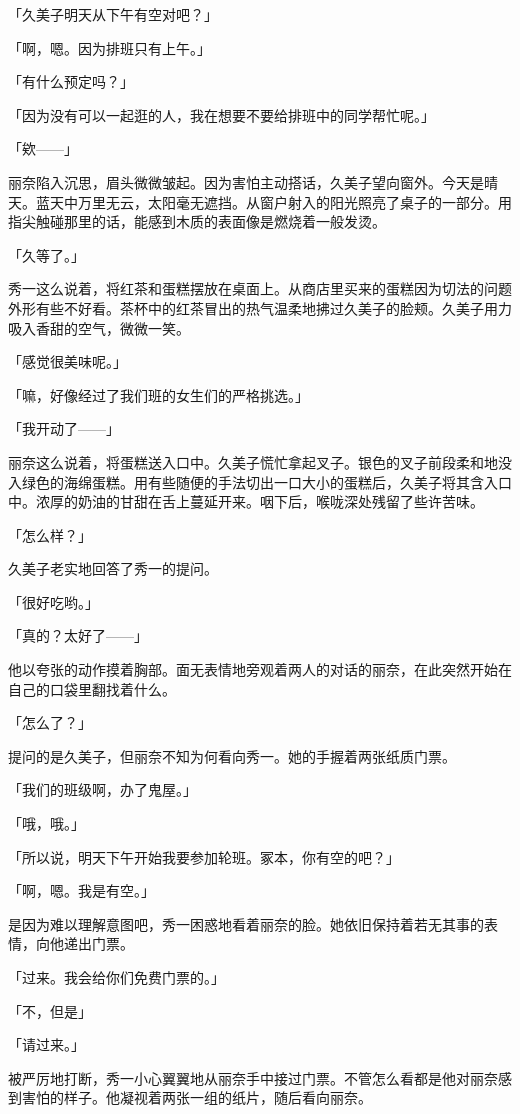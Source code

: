 \documentclass[UTF8]{ctexart}
\begin{document}
    「久美子明天从下午有空对吧？」

    「啊，嗯。因为排班只有上午。」

    「有什么预定吗？」

    「因为没有可以一起逛的人，我在想要不要给排班中的同学帮忙呢。」

    「欸——」

    丽奈陷入沉思，眉头微微皱起。因为害怕主动搭话，久美子望向窗外。今天是晴天。蓝天中万里无云，太阳毫无遮挡。从窗户射入的阳光照亮了桌子的一部分。用指尖触碰那里的话，能感到木质的表面像是燃烧着一般发烫。

    「久等了。」

    秀一这么说着，将红茶和蛋糕摆放在桌面上。从商店里买来的蛋糕因为切法的问题外形有些不好看。茶杯中的红茶冒出的热气温柔地拂过久美子的脸颊。久美子用力吸入香甜的空气，微微一笑。

    「感觉很美味呢。」

    「嘛，好像经过了我们班的女生们的严格挑选。」

    「我开动了——」

    丽奈这么说着，将蛋糕送入口中。久美子慌忙拿起叉子。银色的叉子前段柔和地没入绿色的海绵蛋糕。用有些随便的手法切出一口大小的蛋糕后，久美子将其含入口中。浓厚的奶油的甘甜在舌上蔓延开来。咽下后，喉咙深处残留了些许苦味。

    「怎么样？」

    久美子老实地回答了秀一的提问。

    「很好吃哟。」

    「真的？太好了——」

    他以夸张的动作摸着胸部。面无表情地旁观着两人的对话的丽奈，在此突然开始在自己的口袋里翻找着什么。

    「怎么了？」

    提问的是久美子，但丽奈不知为何看向秀一。她的手握着两张纸质门票。

    「我们的班级啊，办了鬼屋。」

    「哦，哦。」

    「所以说，明天下午开始我要参加轮班。冢本，你有空的吧？」

    「啊，嗯。我是有空。」

    是因为难以理解意图吧，秀一困惑地看着丽奈的脸。她依旧保持着若无其事的表情，向他递出门票。

    「过来。我会给你们免费门票的。」

    「不，但是」

    「请过来。」

    被严厉地打断，秀一小心翼翼地从丽奈手中接过门票。不管怎么看都是他对丽奈感到害怕的样子。他凝视着两张一组的纸片，随后看向丽奈。
\end{document}
